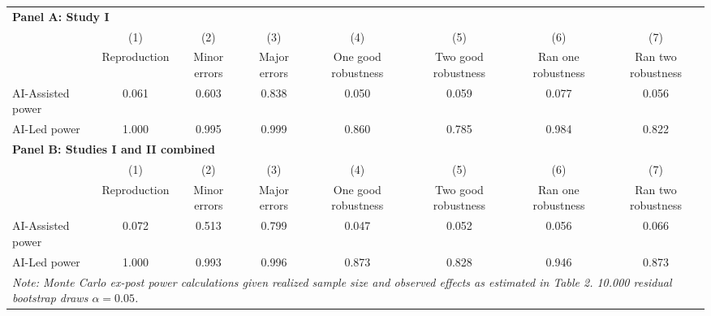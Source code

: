 \begin{tabular}{l*{7}{c}}
\hline\hline
\multicolumn{8}{l}{\textbf{Panel A: Study I}}\\
& (1) & (2) & (3) & (4) & (5) & (6) & (7)\\
                    &Reproduction   &Minor errors   &Major errors   &One good robustness   &Two good robustness   &Ran one robustness   &Ran two robustness   \\
\hline
AI-Assisted power    &0.061 & 0.603 & 0.838 & 0.050 & 0.059 & 0.077 & 0.056 \\
AI-Led power         &1.000 & 0.995 & 0.999 & 0.860 & 0.785 & 0.984 & 0.822 \\
\hline
\multicolumn{8}{l}{\textbf{Panel B: Studies I and II combined}}\\
& (1) & (2) & (3) & (4) & (5) & (6) & (7)\\
                    &Reproduction   &Minor errors   &Major errors   &One good robustness   &Two good robustness   &Ran one robustness   &Ran two robustness   \\
\hline
AI-Assisted power    &0.072 & 0.513 & 0.799 & 0.047 & 0.052 & 0.056 & 0.066 \\
AI-Led power         &1.000 & 0.993 & 0.996 & 0.873 & 0.828 & 0.946 & 0.873 \\
\hline
\hline\hline
\multicolumn{8}{l}{\it{Note:} Monte Carlo ex-post power calculations given realized sample size and observed effects as estimated in Table 2. 10.000 residual bootstrap draws \(\alpha = 0.05\).}\\
\end{tabular}
